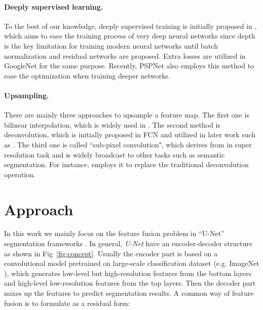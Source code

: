 \documentclass[runningheads]{llncs}
\begin{document}
\paragraph{Deeply supervised learning.}
To the best of our knowledge, deeply supervised training is initially proposed in \cite{Lee2014Deeply}, which aims to ease the training process of very deep neural networks since depth is the key limitation for training modern neural networks until batch normalization \cite{Ioffe2015Batch} and residual networks \cite{He2016Deep} are proposed. Extra losses are utilized in GoogleNet \cite{Szegedy2015Going} for the same purpose. Recently, PSPNet \cite{Zhao2016Pyramid} also employs this method to ease the optimization when training deeper networks.


\paragraph{Upsampling.}
There are mainly three approaches to upsample a feature map. The first one is bilinear interpolation, which is widely used in \cite{Chen2016DeepLab,Chen2017Rethinking,Zhao2016Pyramid,Chen2014Semantic}. The second method is deconvolution, which is initially proposed in FCN \cite{Long2015Fully} and utilized in later work such as \cite{Badrinarayanan2017SegNet,Islam_2017_CVPR,Ronneberger2015U,Peng2017Large,Lin2016RefineNet}. The third one is called ``sub-pixel convolution", which derives from \cite{Shi2016Real,Aitken2017Checkerboard} in super resolution task and is widely broadcast to other tasks such as semantic segmentation. For instance, \cite{Wang2017Understanding} employs it to replace the traditional deconvolution operation. 


\section{Approach}
\label{sec:approach}

In this work we mainly focus on the feature fusion problem in ``U-Net'' segmentation frameworks \cite{Ghiasi2016Laplacian,Islam_2017_CVPR,Ronneberger2015U,Peng2017Large,Long2015Fully,Lin2016RefineNet}. In general, \emph{U-Net} have an encoder-decoder structure as shown in Fig~\ref{fig:concept}. Usually the encoder part is based on a convolutional model pretrained on large-scale classification dataset (e.g. ImageNet \cite{Deng2009ImageNet}), which generates low-level but high-resolution features from the bottom layers and high-level low-resolution features from the top layers. Then the decoder part mixes up the features to predict segmentation results. A common way of feature fusion \cite{Pohlen2016Full,Ghiasi2016Laplacian,Hariharan2014Hypercolumns,Islam_2017_CVPR,Ronneberger2015U,Peng2017Large,Lin2016RefineNet} is to formulate as a residual form:
\end{document}
